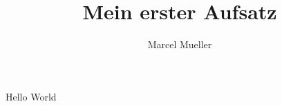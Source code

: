 \documentclass[12pt,a4paper,final]{article}
\author{Marcel Mueller}
\title{Mein erster Aufsatz}
\begin{document}
	\maketitle
	Hello World
\end{document}
